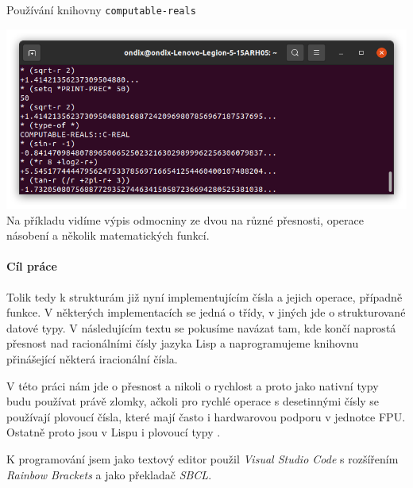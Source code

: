 \begin{myfigure}{}
\caption{Používání knihovny \texttt{computable-reals}}
\includegraphics[width=\linewidth]{./graphics/computable-reals.png}\label{obr:computable-reals}
Na příkladu vidíme výpis odmocniny ze dvou na různé přesnosti, operace násobení a  několik matematických funkcí.
\end{myfigure}\FloatBarrier

\paragraph{Cíl práce}
Tolik tedy k strukturám již nyní implementujícím čísla a jejich operace, případně funkce. V některých implementacích se jedná o třídy, v jiných jde o strukturované datové typy. V následujícím textu se pokusíme navázat tam, kde končí naprostá přesnost nad racionálními čísly jazyka Lisp a naprogramujeme knihovnu přinášející některá iracionální čísla.

V této práci nám jde o přesnost a nikoli o rychlost a proto jako nativní typy budu používat právě zlomky, ačkoli pro rychlé operace s desetinnými čísly se používají plovoucí čísla, které mají často i hardwarovou podporu v jednotce FPU. Ostatně proto jsou v Lispu i plovoucí typy \cite{PS:PCL}.

K programování jsem jako textový editor použil \textit{Visual Studio Code} s rozšířením \textit{Rainbow Brackets} a jako překladač \textit{SBCL}.